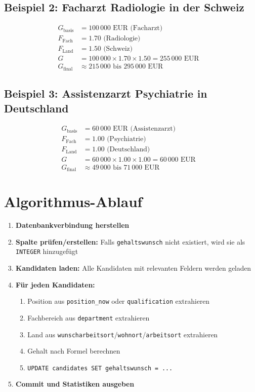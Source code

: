 \documentclass[12pt,a4paper]{article}
\begin{document}
\subsection{Beispiel 2: Facharzt Radiologie in der Schweiz}

\begin{align*}
    G_{\text{basis}} &= 100\,000 \text{ EUR (Facharzt)} \\
    F_{\text{Fach}} &= 1.70 \text{ (Radiologie)} \\
    F_{\text{Land}} &= 1.50 \text{ (Schweiz)} \\
    G &= 100\,000 \times 1.70 \times 1.50 = 255\,000 \text{ EUR} \\
    G_{\text{final}} &\approx 215\,000 \text{ bis } 295\,000 \text{ EUR}
\end{align*}

\subsection{Beispiel 3: Assistenzarzt Psychiatrie in Deutschland}

\begin{align*}
    G_{\text{basis}} &= 60\,000 \text{ EUR (Assistenzarzt)} \\
    F_{\text{Fach}} &= 1.00 \text{ (Psychiatrie)} \\
    F_{\text{Land}} &= 1.00 \text{ (Deutschland)} \\
    G &= 60\,000 \times 1.00 \times 1.00 = 60\,000 \text{ EUR} \\
    G_{\text{final}} &\approx 49\,000 \text{ bis } 71\,000 \text{ EUR}
\end{align*}

\section{Algorithmus-Ablauf}

\begin{enumerate}
    \item \textbf{Datenbankverbindung herstellen}
    \item \textbf{Spalte prüfen/erstellen:} Falls \texttt{gehaltswunsch} nicht existiert, wird sie als \texttt{INTEGER} hinzugefügt
    \item \textbf{Kandidaten laden:} Alle Kandidaten mit relevanten Feldern werden geladen
    \item \textbf{Für jeden Kandidaten:}
    \begin{enumerate}
        \item Position aus \texttt{position\_now} oder \texttt{qualification} extrahieren
        \item Fachbereich aus \texttt{department} extrahieren
        \item Land aus \texttt{wunscharbeitsort}/\texttt{wohnort}/\texttt{arbeitsort} extrahieren
        \item Gehalt nach Formel berechnen
        \item \texttt{UPDATE candidates SET gehaltswunsch = ...}
    \end{enumerate}
    \item \textbf{Commit und Statistiken ausgeben}
\end{enumerate}
\end{document}
